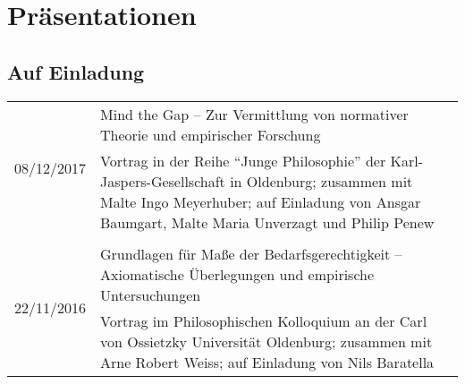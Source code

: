 \documentclass[a4paper,10pt]{article}
\begin{document}
\clearpage
\section{Präsentationen}
\subsection*{Auf Einladung}
\begin{longtable}{p{}p{}}
\multirow{2}{1,75cm}{\footnotesize{08/12/2017}} & Mind the Gap -- Zur Vermittlung von normativer Theorie und empirischer Forschung\\
& \footnotesize{Vortrag in der Reihe \enquote{Junge Philosophie} der Karl-Jaspers-Gesellschaft in Oldenburg; zusammen mit Malte Ingo Meyerhuber; auf Einladung von Ansgar Baumgart, Malte Maria Unverzagt und Philip Penew}\\
\\
\multirow{2}{1,75cm}{\footnotesize{22/11/2016}} & Grundlagen für Maße der Bedarfsgerechtigkeit -- Axiomatische Überlegungen und empirische Untersuchungen\\
& \footnotesize{Vortrag im Philosophischen Kolloquium an der Carl von Ossietzky Universität Oldenburg; zusammen mit Arne Robert Weiss; auf Einladung von Nils Baratella}\\
\end{longtable}
\end{document}
